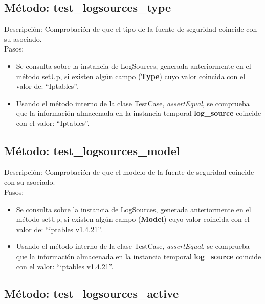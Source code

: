 

\subsection{\quad Método: test\_logsources\_type}

Descripción: Comprobación de que el tipo de la fuente de seguridad coincide con su asociado.\\
Pasos:
\begin{itemize}
\item Se consulta sobre la instancia de LogSources, generada anteriormente en el método setUp, si existen algún campo (\textbf{Type}) cuyo valor coincida con el valor de: ``Iptables''.
\item Usando el método interno de la clase TestCase, \emph{assertEqual}, se comprueba que la información almacenada en la instancia temporal \textbf{log\_source} coincide con el valor: ``Iptables''.
\end{itemize}



\subsection{\quad Método: test\_logsources\_model}

Descripción: Comprobación de que el modelo de la fuente de seguridad coincide con su asociado.\\
Pasos:
\begin{itemize}
\item Se consulta sobre la instancia de LogSources, generada anteriormente en el método setUp, si existen algún campo (\textbf{Model}) cuyo valor coincida con el valor de: ``iptables v1.4.21''.
\item Usando el método interno de la clase TestCase, \emph{assertEqual}, se comprueba que la información almacenada en la instancia temporal \textbf{log\_source} coincide con el valor: ``iptables v1.4.21''.
\end{itemize}



\subsection{\quad Método: test\_logsources\_active}

